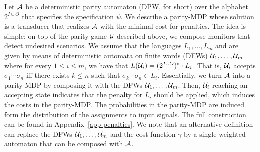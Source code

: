\documentclass[runningheads,a4paper]{llncs}
\newcommand{\zug}[1]{\langle #1  \rangle}
\newcommand{\stam}[1]{}
\newcommand{\A}{{\cal A}}
\newcommand{\G}{{\cal G}}
\newcommand{\M}{{\cal M}}
\newcommand{\U}{{\cal U}}
\newcommand{\tIN}{{2^I}}
\newcommand{\tOUT}{{2^O}}
\newcommand{\MDPProb}{{\rm P}}
\newcommand{\MDPcost}{{\it cost}}
\begin{document}
Let $\A$ be a deterministic parity automaton (DPW, for short) over the alphabet $2^{I \cup O}$ that specifies the specification $\psi$. 
We describe a parity-MDP whose solution is a transducer that realizes $\A$ with the minimal cost for penalties. The idea is simple: on top of the parity game $\G$ described above, we compose monitors that detect undesired scenarios. We assume that the languages $L_1,\ldots,L_m$ and are given by means of deterministic automata on finite words (DFWs)  $\U_1,\ldots,\U_m$ where for every $1\le i\le m$, we have that $L(\U_i)=(2^{I\cup O})^*\cdot L_i$. That is, $\U_i$ accepts $\sigma_1\cdots \sigma_n$ iff there exists $k\le n$ such that $\sigma_k\cdots \sigma_n\in L_i$. Essentially, we turn $\A$ into a parity-MDP by composing it with the DFWs $\U_1,\ldots,\U_m$. Then, $\U_i$ reaching an accepting state indicates that the penalty for $L_i$ should be applied, which induces the costs in the parity-MDP. The probabilities in the parity-MDP are induced form the distribution of the assignments to input signals. The full construction can be found in Appendix~\ref{app penalties}. We note that an alternative definition can replace the DFWs $\U_1,\ldots,\U_m$ and the cost function $\gamma$ by a single weighted automaton that can be composed with $\A$.

\stam{
Let $\U_i=\zug{\tIN\times\tOUT,Q^i,q^i_0,\delta^i,\alpha^i}$
Let $S=Q \times S_1 \times \cdots S_m$ and $s_0=\zug{q_0,q_0^1,\ldots,q_0^m}$. We define the parity-MDP $\M=\zug{S \times 2^I,S,s_0,2^O,2^I,\delta_1,\delta_2,\MDPProb,\MDPcost,\alpha'}$ where for every $s=\zug{q,q^1,...,q^m}\in S$, $i\in \tIN$, and $o\in \tOUT$, we have the following. The transition functions are $\delta_1(\zug{s,i},o)=\zug{\delta(q,i \cup o),\delta^1(q^1,i \cup o),\ldots,\delta^m(q^m,i \cup o)}$, and $\delta_2(s,i)=\zug{s,i}$, the cost function is given by $\MDPcost(\zug{s,i})=0$ and $\MDPcost(s)=\sum_{j:q^j\in \alpha^j}\gamma(j)$, for the penally function $\gamma$, and the acceptance condition is $\alpha(s)=\alpha(\zug{s,i})=\alpha(q)$. Finally, we assume that the environment behaves uniformly. That is, in every step it outputs every $i\subseteq I$ with probability $2^{-|I|}$. Thus, $\MDPProb(s,i)=2^{-|I|}$. This assumption can easily be replaced by a different probabilistic model. 

It is easy to see that a winning strategy for Player~1 in $\M$ corresponds to a transducer that realizes $\A$, and that the cost of every computation is the average penalty along the computation. Thus, a solution to the synthesis with penalties problem amounts to solving $\M$. The size of $\M$ is polynomial in the size of the automata $\A,\U_1,\ldots \U_m$, and is exponential in $m$. However, we observe that the role of $\U_1,\ldots, \U_m$ is only for the purpose of costs, and does not affect the parity constraints. Thus, we can solve the problem in NP$\cap$co-NP in the size of the automata, and in time singly-exponential in $m$.
Finally, if $\A$ is obtained by translating an LTL formula $\psi$ into a DPW, then similarly to the case of Boolean synthesis, we can solve the problem in times doubly-exponential in the length of $\psi$, polynomial in $\U_1,\ldots,\U_m$, and singly-exponential in $m$.
}
 
\end{document}
